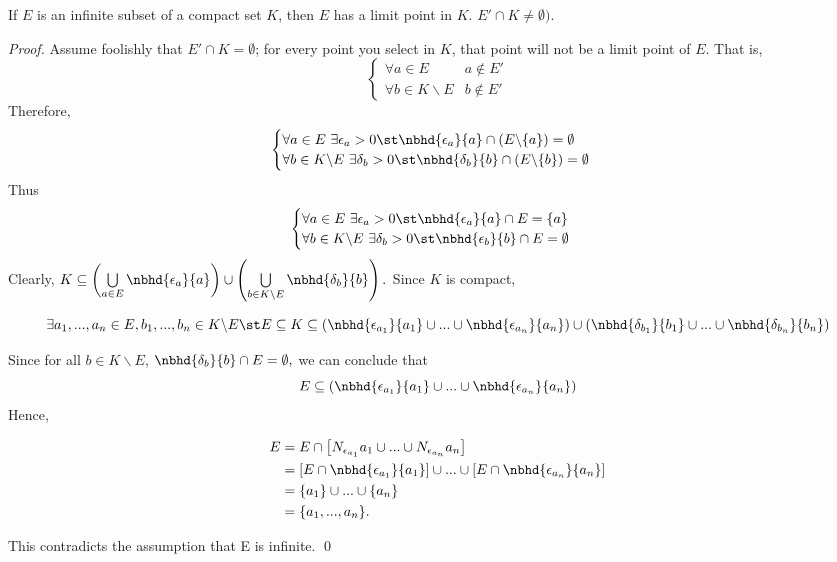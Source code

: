 \documentclass[a4paper]{article}
\begin{document}
	\begin{theorem}
		If $E$ is an infinite subset of a compact set $K$, then $E$ has a limit point in $K$. $E'\cap K \not = \emptyset)$.
	\end{theorem}
	
	\begin{proof}
		Assume foolishly that $E'\cap K = \emptyset$; for every point you select in $K$, that point will not be a limit point of $E$. That is,
		$$
		\begin{cases}
			\forall a \in E &a\not \in E' \\
			\forall b \in K \backslash E &b\not \in E'
		\end{cases}
		$$
		Therefore,
		$$
		\begin{cases}
			\forall a \in E ~\exists \epsilon_a > 0 \st \nbhd{\epsilon_a}{a}\cap (E \backslash \{a\})=\emptyset \\
			\forall b \in K \backslash E ~\exists \delta_b > 0 \st \nbhd{\delta_b}{b}\cap (E \backslash \{b\})=\emptyset \\
		\end{cases}
		$$
		Thus
		$$
		\begin{cases}
			\forall a \in E ~\exists \epsilon_a > 0 \st \nbhd{\epsilon_a}{a}\cap E = \{a\} \\
			\forall b \in K \backslash E ~\exists \delta_b > 0 \st \nbhd{\epsilon_b}{b}\cap E = \emptyset
		\end{cases}
		$$
		Clearly, $K \subseteq \left( \bigcup \limits_{a\in E} \nbhd{\epsilon_a}{a}
		\right) \cup \left( \bigcup \limits_{b\in K\backslash E} \nbhd{\delta_b}{b}\right).$ Since $K$ is compact,
		
		$$\exists a_1,...,a_n \in E, b_1,...,b_n \in K \backslash E \st \\ E \subseteq K \subseteq \left(\nbhd{\epsilon_{a_1}}{a_1}\cup...\cup \nbhd{\epsilon_{a_n}}{a_n}\right)\cup \left(\nbhd{\delta_{b_1}}{b_1}\cup...\cup \nbhd{\delta_{b_n}}{b_n}\right) $$
		
		Since for all $b\in K \backslash E$, $\nbhd{\delta_b}{b}\cap E = \emptyset,$ we can conclude that
		$$E \subseteq \left( \nbhd{\epsilon_{a_1}}{a_1} \cup...\cup \nbhd{\epsilon_{a_n}}{a_n} \right)$$
		Hence, 
		
		\begin{align*}
			E &= E \cap \left[ N_{\epsilon_{a_1}}a_1 \cup ... \cup N_{\epsilon_{a_n}}a_n \right] \\
				&= \left [E\cap \nbhd{\epsilon_{a_1}}{a_1} \right] \cup ... \cup \left[ E \cap \nbhd{\epsilon_{a_n}}{a_n}\right] \\
				&= \{a_1\} \cup ... \cup \{a_n\} \\
				&= \{a_1,...,a_n\}.
		\end{align*}
		
		This contradicts the assumption that E is infinite. \qed
	\end{proof}
	
\end{document}
